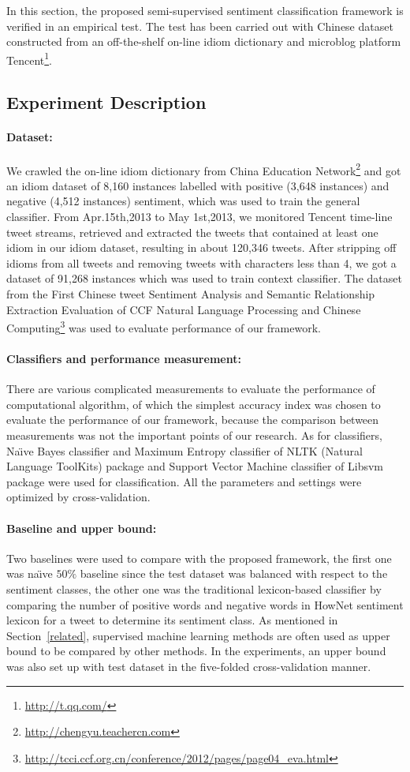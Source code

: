 \documentclass{llncs}
\begin{document}
In this section, the proposed semi-supervised sentiment classification framework is verified in an empirical test. 
The test has been carried out with Chinese dataset constructed from an off-the-shelf on-line idiom dictionary and microblog platform Tencent\footnote{\url{http://t.qq.com/}}. 

\subsection{Experiment Description}
\label{description}

\paragraph{Dataset:}
We crawled the on-line idiom dictionary from China Education Network\footnote{\url{http://chengyu.teachercn.com}} and got an idiom dataset of 8,160 instances labelled with positive (3,648 instances) and negative (4,512 instances) sentiment, which was used to train the general classifier. 
From Apr.15th,2013 to May 1st,2013, we monitored Tencent time-line tweet streams, retrieved and extracted the tweets that contained at least one idiom in our idiom dataset, resulting in about 120,346 tweets. 
After stripping off idioms from all tweets and removing tweets with characters less than 4, we got a dataset of 91,268 instances which was used to train context classifier. 
The dataset from the First Chinese tweet Sentiment Analysis and Semantic Relationship Extraction Evaluation of CCF Natural Language Processing and Chinese Computing\footnote{\url{http://tcci.ccf.org.cn/conference/2012/pages/page04_eva.html}} was used to evaluate performance of our framework. 
\paragraph{Classifiers and performance measurement:}
There are various complicated measurements to evaluate the performance of computational algorithm, of which the simplest accuracy index was chosen to evaluate the performance of our framework, because the comparison between measurements was not the important points of our research. 
As for classifiers, Na\"\i ve Bayes classifier and Maximum Entropy classifier of NLTK (Natural Language ToolKits) \cite{xsongx:b27} package and Support Vector Machine classifier of Libsvm \cite{xsongx:b28} package were used for classification. 
All the parameters and settings were optimized by cross-validation.
\paragraph{Baseline and upper bound:}
Two baselines were used to compare with the proposed framework, the first one was na\"\i ve $ 50\% $ baseline since the test dataset was balanced with respect to the sentiment classes, the other one was the traditional lexicon-based classifier by comparing the number of positive words and negative words in HowNet sentiment lexicon for a tweet to determine its sentiment class.
As mentioned in Section~\ref{related}, supervised machine learning methods are often used as upper bound to be compared by other methods. 
In the experiments, an upper bound was also set up with test dataset in the five-folded cross-validation manner.
\end{document}
